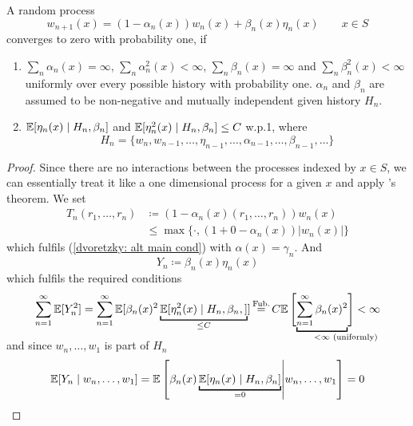 \begin{lemma}\label{lemma following dvoretzky}
    A random process
    \[
        w_{n+1}(x)=(1-\alpha_n(x))w_n(x) +\beta_n(x)\eta_n(x) \qquad x\in S
    \]
    converges to zero with probability one, if 
    \begin{enumerate}
        \item \(\sum_n \alpha_n(x)=\infty\), \(\sum_n \alpha_n^2(x) <\infty\), \(\sum_n\beta_n(x)=\infty\) and \(\sum_n \beta_n^2 (x)<\infty\) uniformly over every possible history with probability one. \(\alpha_n\) and \(\beta_n\) are assumed to be non-negative and mutually independent given history \(H_n\).
        \item \(\mathbb{E}[\eta_n(x)\mid H_n, \beta_n]  \) and \( \mathbb{E}[\eta_n^2(x)\mid H_n,\beta_n]\le C \) w.p.1, where 
        \[
            H_n=\{w_n, w_{n-1}, \dots, \eta_{n-1}, \dots, \alpha_{n-1},\dots, \beta_{n-1},\dots\}
        \]
    \end{enumerate}
\end{lemma}
\begin{proof}
    Since there are no interactions between the processes indexed by \(x\in S\), we can essentially treat it like a one dimensional process for a given \(x\) and apply \citeauthor{dvoretzkyStochasticApproximation1956}'s theorem. 
    We set 
    \begin{align}
        T_n(r_1,\dots, r_n)
        &\coloneqq (1-\alpha_n(x)(r_1,\dots,r_n)) w_n(x) \\
        &\le \max\{\cdot, (1+ 0 -\alpha_n(x))|w_n(x)|\}
    \end{align}
    which fulfils (\ref{dvoretzky: alt main cond}) with \(\alpha(x)=\gamma_n\). And
    \[
       Y_n\coloneqq \beta_n(x) \eta_n(x)
    \]
    which fulfils the required conditions
    \[
        \sum_{n=1}^\infty \E[Y_n^2] 
        = \sum_{n=1}^\infty \E[\beta_n(x)^2\underbracket[1pt]{\E[\eta_n^2(x)\mid H_n,\beta_n,]}_{\le C}]
        \xeq{\text{Fub.}} C \E\left[\vphantom{\sum_{n=1}^\infty}
            \smash{\underbracket[1pt]{
                \sum_{n=1}^\infty \beta_n(x)^2}_{
                <\infty \mathrlap{\text{ (uniformly)}}
                }}
        \right] <\infty
    \]
    and since \(w_n,\dots, w_1\) is part of \(H_n\) 
    \[
        \E[Y_n\mid w_n,\dots, w_1]=\E\left[\beta_n(x) \underbracket[1pt]{\E[\eta_n(x)\mid H_n, \beta_n]}_{\smash{=0}}   \middle| w_n,\dots, w_1\right]=0\qedhere
    \]
\end{proof}

